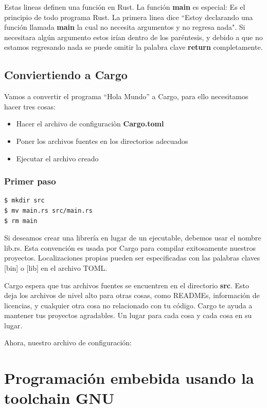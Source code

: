 \documentclass[12pt, twoside]{report}
\begin{document}
Estas lineas definen una función en Rust. La función \textbf{main} es especial: Es el principio de todo programa Rust. La primera linea dice ``Estoy declarando una función llamada \textbf{main} la cual no necesita argumentos y no regresa nada". Si necesitara algún argumento estos irían dentro de los paréntesis, y debido a que no estamos regresando nada se puede omitir la palabra clave \textbf{return} completamente.

\section{Conviertiendo a Cargo}

Vamos a convertir el programa ``Hola Mundo'' a Cargo, para ello necesitamos hacer tres cosas: 

\begin{itemize}
\item Hacer el archivo de configuraciòn \textbf{Cargo.toml}
\item Poner los archivos fuentes en los directorios adecuados
\item Ejecutar el archivo creado
\end{itemize}

\subsection{Primer paso}

\begin{lstlisting}[language=bash]
$ mkdir src
$ mv main.rs src/main.rs 
$ rm main 
\end{lstlisting}

Si deseamos crear una librería en lugar de un ejecutable, debemos usar el nombre lib.rs. Esta convención es usada por Cargo para compilar exitosamente nuestros proyectos. Localizaciones propias pueden ser especificadas con las palabras claves [bin] o [lib] en el archivo TOML.

Cargo espera que tus archivos fuentes se encuentren en el directorio \textbf{src}. Esto deja los archivos de nivel alto para otras cosas, como READMEs, información de licencias, y cualquier otra cosa no relacionado con tu código. Cargo te ayuda a mantener tus proyectos agradables. Un lugar para cada cosa y cada cosa en su lugar.

Ahora, nuestro archivo de configuración:
\chapter{Programación embebida usando la toolchain GNU}
\end{document}
